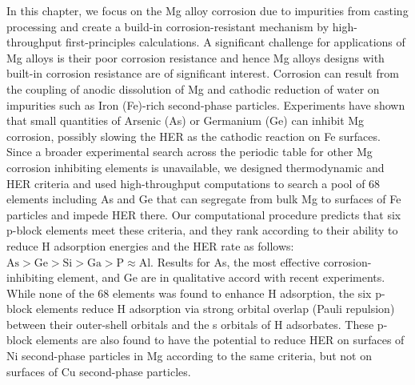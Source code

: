 In this chapter, we focus on the Mg alloy corrosion due to impurities from casting processing and create a build-in corrosion-resistant mechanism by high-throughput first-principles calculations. A significant challenge for applications of Mg alloys is their poor corrosion resistance and hence Mg alloys designs with built-in corrosion resistance are of significant interest. Corrosion can result from the coupling of anodic dissolution of Mg and cathodic reduction of water on impurities such as Iron (Fe)-rich second-phase particles. Experiments have shown that small quantities of Arsenic (As) or Germanium (Ge) can inhibit Mg corrosion, possibly slowing the \ac{HER} as the cathodic reaction on Fe surfaces. Since a broader experimental search across the periodic table for other Mg corrosion inhibiting elements is unavailable, we designed thermodynamic and \ac{HER} criteria and used high-throughput computations to search a pool of 68 elements including As and Ge that can segregate from bulk Mg to surfaces of Fe particles and impede \ac{HER} there. Our computational procedure predicts that six p-block elements meet these criteria, and they rank according to their ability to reduce H adsorption energies and the \ac{HER} rate as follows: $\text{As} > \text{Ge} > \text{Si} > \text{Ga} > \text{P} \approx \text{Al}$. Results for As, the most effective corrosion-inhibiting element, and Ge are in qualitative accord with recent experiments. While none of the 68 elements was found to enhance H adsorption, the six p-block elements reduce H adsorption via strong orbital overlap (Pauli repulsion) between their outer-shell orbitals and the s orbitals of H adsorbates. These p-block elements are also found to have the potential to reduce \ac{HER} on surfaces of Ni second-phase particles in Mg according to the same criteria, but not on surfaces of Cu second-phase particles. 








